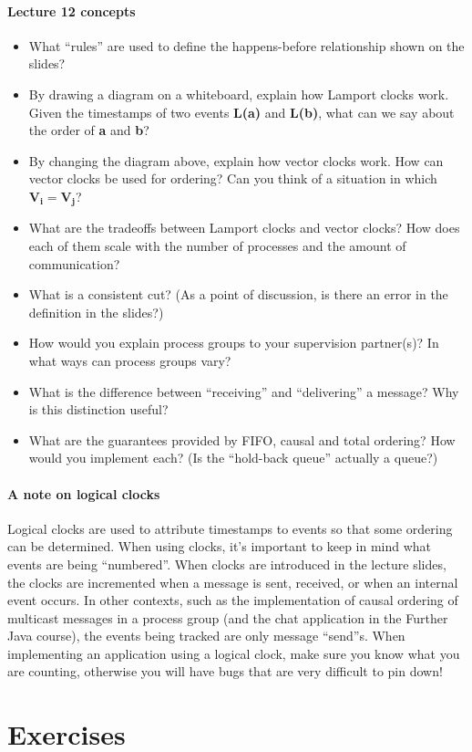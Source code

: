 \documentclass[12pt,a4paper,oneside,openright]{report}
\newcommand{\question}[2]{\paragraph{#1} #2}
\begin{document}
\question{Lecture 12 concepts}{
  \begin{itemize}
  \item What ``rules'' are used to define the happens-before
    relationship shown on the slides?
  \item By drawing a diagram on a whiteboard, explain how Lamport
    clocks work. Given the timestamps of two events \textbf{L(a)} and
    \textbf{L(b)}, what can we say about the order of \textbf{a} and
    \textbf{b}?
  \item By changing the diagram above, explain how vector clocks
    work. How can vector clocks be used for ordering? Can you think of
    a situation in which $\mathbf{V_i = V_j}$?
  \item What are the tradeoffs between Lamport clocks and vector
    clocks? How does each of them scale with the number of processes
    and the amount of communication?
  \item What is a consistent cut? (As a point of discussion, is there
    an error in the definition in the slides?)
  \item How would you explain process groups to your supervision
    partner(s)? In what ways can process groups vary?
  \item What is the difference between ``receiving'' and
    ``delivering'' a message? Why is this distinction useful?
  \item What are the guarantees provided by FIFO, causal and total
    ordering? How would you implement each? (Is the ``hold-back
    queue'' actually a queue?)
  \end{itemize}
}

\question{A note on logical clocks}{Logical clocks are used to
  attribute timestamps to events so that some ordering can be
  determined. When using clocks, it's important to keep in mind what
  events are being ``numbered''. When clocks are introduced in the
  lecture slides, the clocks are incremented when a message is sent,
  received, or when an internal event occurs. In other contexts, such
  as the implementation of causal ordering of multicast messages in a
  process group (and the chat application in the Further Java course),
  the events being tracked are only message ``send''s. When
  implementing an application using a logical clock, make sure you
  know what you are counting, otherwise you will have bugs that are
  very difficult to pin down!}

\section{Exercises}
\end{document}
